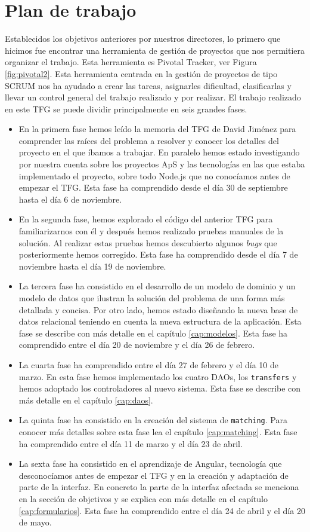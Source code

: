 \documentclass[11pt]{book}
\begin{document}
	\section{Plan de trabajo}
	Establecidos los objetivos anteriores por nuestros directores, lo primero que hicimos fue encontrar una herramienta de gestión de proyectos que nos permitiera organizar el trabajo. Esta herramienta es Pivotal Tracker, ver Figura \ref{fig:pivotal2}. Esta herramienta centrada en la gestión de proyectos de tipo SCRUM nos ha ayudado a crear las tareas, asignarles dificultad, clasificarlas y llevar un control general del trabajo realizado y por realizar. El trabajo realizado en este TFG se puede dividir principalmente en seis grandes fases.
	\begin{itemize} 
		\item En la primera fase hemos leído la memoria del TFG de David Jiménez para comprender las raíces del problema a resolver y conocer los detalles del proyecto en el que íbamos a trabajar. En paralelo hemos estado investigando por nuestra cuenta sobre los proyectos ApS y las tecnologías en las que estaba implementado el proyecto, sobre todo Node.js que no conocíamos antes de empezar el TFG. Esta fase ha comprendido desde el día 30 de septiembre hasta el día 6 de noviembre.
		\item En la segunda fase, hemos explorado el código del anterior TFG para familiarizarnos con él y después hemos realizado pruebas manuales de la solución. Al realizar estas pruebas hemos descubierto algunos \textit{bugs} que posteriormente hemos corregido. Esta fase ha comprendido desde el día 7 de noviembre hasta el día 19 de noviembre.
		\item La tercera fase ha consistido en el desarrollo de un modelo de dominio y un modelo de datos que ilustran la solución del problema de una forma más detallada y concisa. Por otro lado, hemos estado diseñando la nueva base de datos relacional teniendo en cuenta la nueva estructura de la aplicación. Esta fase se describe con más detalle en el capítulo \ref{cap:modelos}. Esta fase ha comprendido entre el día 20 de noviembre y el día 26 de febrero.
		\item La cuarta fase ha comprendido entre el día 27 de febrero y  el día 10 de marzo. En esta fase hemos implementado los cuatro DAOs, los \texttt{transfers} y hemos adoptado los controladores al nuevo sistema. Esta fase se describe con más detalle en el capítulo \ref{cap:daos}.
		\item La quinta fase ha consistido en la creación del sistema de \texttt{matching}. Para conocer más detalles sobre esta fase lea el capítulo \ref{cap:matching}. Esta fase ha comprendido entre el día 11 de marzo y el día 23 de abril.
		\item La sexta fase ha consistido en el aprendizaje de Angular, tecnología que desconocíamos antes de empezar el TFG y en la creación y adaptación de parte de la interfaz. En concreto la parte de la interfaz afectada se menciona en la sección de objetivos y se explica con más detalle en el capítulo \ref{cap:formularios}. Esta fase ha comprendido entre el día 24 de abril y el día 20 de mayo.
		

\end{itemize}
\end{document}
